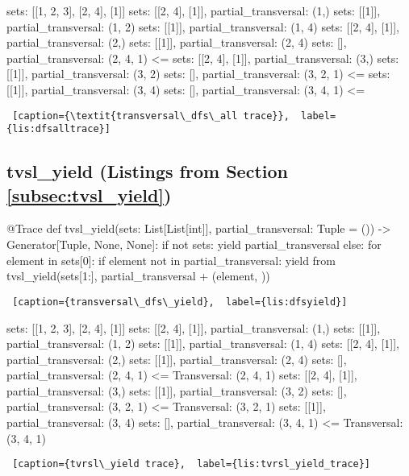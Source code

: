 \noindent
\begin{minipage}{\linewidth}   \hrulefill  
\begin{python}
sets: [[1, 2, 3], [2, 4], [1]]
  sets: [[2, 4], [1]], partial_transversal: (1,)
    sets: [[1]], partial_transversal: (1, 2)
    sets: [[1]], partial_transversal: (1, 4)
  sets: [[2, 4], [1]], partial_transversal: (2,)
    sets: [[1]], partial_transversal: (2, 4)
      sets: [], partial_transversal: (2, 4, 1) <=
  sets: [[2, 4], [1]], partial_transversal: (3,)
    sets: [[1]], partial_transversal: (3, 2)
      sets: [], partial_transversal: (3, 2, 1) <=
    sets: [[1]], partial_transversal: (3, 4)
      sets: [], partial_transversal: (3, 4, 1) <=
\end{python}
\begin{lstlisting} [caption={\textit{transversal\_dfs\_all trace}},  label={lis:dfsalltrace}]
\end{lstlisting}
\end{minipage}


\subsection{tvsl\_yield (Listings from Section \ref{subsec:tvsl_yield})} \label{appsubsec:tvsl_yield}

\begin{minipage}{\linewidth}   \hrulefill
\begin{python}[numbers=left]
@Trace
def tvsl_yield(sets: List[List[int]], partial_transversal: Tuple = ()) -> Generator[Tuple, None, None]:
  if not sets:
    yield partial_transversal
  else:
    for element in sets[0]:
      if element not in partial_transversal:
        yield from tvsl_yield(sets[1:], partial_transversal + (element, ))
\end{python}
\begin{lstlisting} [caption={transversal\_dfs\_yield},  label={lis:dfsyield}]
\end{lstlisting}
\end{minipage}

\noindent
\begin{minipage}{\linewidth} \largev
\begin{python}
sets: [[1, 2, 3], [2, 4], [1]]
  sets: [[2, 4], [1]], partial_transversal: (1,)
    sets: [[1]], partial_transversal: (1, 2)
    sets: [[1]], partial_transversal: (1, 4)
  sets: [[2, 4], [1]], partial_transversal: (2,)
    sets: [[1]], partial_transversal: (2, 4)
      sets: [], partial_transversal: (2, 4, 1) <=
Transversal: (2, 4, 1)
  sets: [[2, 4], [1]], partial_transversal: (3,)
    sets: [[1]], partial_transversal: (3, 2)
      sets: [], partial_transversal: (3, 2, 1) <=
Transversal: (3, 2, 1)
    sets: [[1]], partial_transversal: (3, 4)
      sets: [], partial_transversal: (3, 4, 1) <=
Transversal: (3, 4, 1)
\end{python}
\begin{lstlisting} [caption={tvrsl\_yield trace},  label={lis:tvrsl_yield_trace}]
\end{lstlisting}
\end{minipage}

